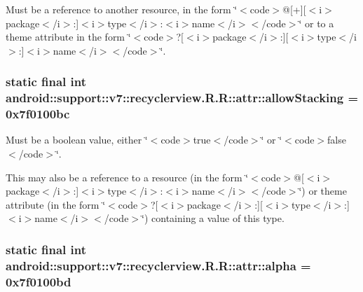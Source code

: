 Must be a reference to another resource, in the form \char`\"{}$<$code$>$@\mbox{[}+\mbox{]}\mbox{[}$<$i$>$package$<$/i$>$:\mbox{]}$<$i$>$type$<$/i$>$:$<$i$>$name$<$/i$>$$<$/code$>$\char`\"{} or to a theme attribute in the form \char`\"{}$<$code$>$?\mbox{[}$<$i$>$package$<$/i$>$:\mbox{]}\mbox{[}$<$i$>$type$<$/i$>$:\mbox{]}$<$i$>$name$<$/i$>$$<$/code$>$\char`\"{}. \hypertarget{classandroid_1_1support_1_1v7_1_1recyclerview_1_1_r_1_1attr_02167a5846f822b129c7f351c678df2e}{
\subsubsection[{allowStacking}]{\setlength{\rightskip}{0pt plus 5cm}static final int android::support::v7::recyclerview.R.R::attr::allowStacking = 0x7f0100bc}}
\label{classandroid_1_1support_1_1v7_1_1recyclerview_1_1_r_1_1attr_02167a5846f822b129c7f351c678df2e}


Must be a boolean value, either \char`\"{}$<$code$>$true$<$/code$>$\char`\"{} or \char`\"{}$<$code$>$false$<$/code$>$\char`\"{}. 

This may also be a reference to a resource (in the form \char`\"{}$<$code$>$@\mbox{[}$<$i$>$package$<$/i$>$:\mbox{]}$<$i$>$type$<$/i$>$:$<$i$>$name$<$/i$>$$<$/code$>$\char`\"{}) or theme attribute (in the form \char`\"{}$<$code$>$?\mbox{[}$<$i$>$package$<$/i$>$:\mbox{]}\mbox{[}$<$i$>$type$<$/i$>$:\mbox{]}$<$i$>$name$<$/i$>$$<$/code$>$\char`\"{}) containing a value of this type. \hypertarget{classandroid_1_1support_1_1v7_1_1recyclerview_1_1_r_1_1attr_f54198039fbfd1ec50fbfeafaaeaef72}{
\subsubsection[{alpha}]{\setlength{\rightskip}{0pt plus 5cm}static final int android::support::v7::recyclerview.R.R::attr::alpha = 0x7f0100bd}}
\label{classandroid_1_1support_1_1v7_1_1recyclerview_1_1_r_1_1attr_f54198039fbfd1ec50fbfeafaaeaef72}


